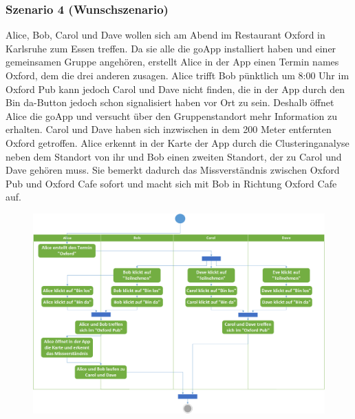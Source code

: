 \documentclass{scrartcl}
\begin{document}
	\subsubsection{Szenario 4 (Wunschszenario)}
	Alice, Bob, Carol und Dave wollen sich am Abend im Restaurant \glqq{}Oxford\grqq{} in Karlsruhe zum Essen treffen. 
	Da sie alle die goApp installiert haben und einer gemeinsamen Gruppe angehören, erstellt Alice in der App 		einen Termin names \glqq{}Oxford\grqq{}, dem die drei anderen zusagen. Alice trifft Bob pünktlich um 8:00 Uhr im 		\glqq{}Oxford Pub\grqq{} kann jedoch Carol und Dave nicht finden, die in der App durch den \glqq{}Bin da\grqq{}-Button 		jedoch schon signalisiert haben vor Ort zu sein. Deshalb öffnet Alice die goApp und versucht über den Gruppenstandort 		mehr Information zu erhalten. Carol und Dave haben sich inzwischen in dem 200 Meter entfernten \glqq{}Oxford 			\grqq{} getroffen. Alice erkennt in der Karte der App durch die Clusteringanalyse neben dem Standort von ihr und 		Bob einen zweiten Standort, der zu Carol und Dave gehören muss. Sie bemerkt dadurch das Missverständnis zwischen 		\glqq{}Oxford Pub\grqq{} und \glqq{}Oxford Cafe\grqq{} sofort und macht sich mit Bob in Richtung \glqq{}Oxford 			Cafe\grqq{} auf.    \newline
	\newline
	\newline
	
	
	\begin{figure}[h]
		\includegraphics[width=\textwidth]{Szenario4}
	\end{figure}
	\newpage
	
	
	
	\newpage
	
\end{document}
